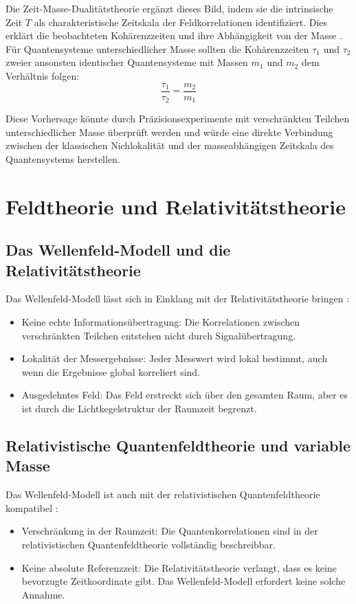 \documentclass[a4paper,12pt]{article}
\begin{document}
	Die Zeit-Masse-Dualitätstheorie ergänzt dieses Bild, indem sie die intrinsische Zeit $T$ als charakteristische Zeitskala der Feldkorrelationen identifiziert. Dies erklärt die beobachteten Kohärenzzeiten und ihre Abhängigkeit von der Masse \cite{Pascher2024}. Für Quantensysteme unterschiedlicher Masse sollten die Kohärenzzeiten $\tau_1$ und $\tau_2$ zweier ansonsten identischer Quantensysteme mit Massen $m_1$ und $m_2$ dem Verhältnis folgen:
	\begin{equation}
		\frac{\tau_1}{\tau_2} = \frac{m_2}{m_1}
	\end{equation}
	
	Diese Vorhersage könnte durch Präzisionsexperimente mit verschränkten Teilchen unterschiedlicher Masse überprüft werden und würde eine direkte Verbindung zwischen der klassischen Nichlokalität und der masseabhängigen Zeitskala des Quantensystems herstellen.
	
	\section{Feldtheorie und Relativitätstheorie}
	
	\subsection{Das Wellenfeld-Modell und die Relativitätstheorie}
	Das Wellenfeld-Modell lässt sich in Einklang mit der Relativitätstheorie bringen \cite{Maudlin2011}:
	\begin{itemize}
		\item Keine echte Informationsübertragung: Die Korrelationen zwischen verschränkten Teilchen entstehen nicht durch Signalübertragung.
		\item Lokalität der Messergebnisse: Jeder Messwert wird lokal bestimmt, auch wenn die Ergebnisse global korreliert sind.
		\item Ausgedehntes Feld: Das Feld erstreckt sich über den gesamten Raum, aber es ist durch die Lichtkegelstruktur der Raumzeit begrenzt.
	\end{itemize}
	
	\subsection{Relativistische Quantenfeldtheorie und variable Masse}
	Das Wellenfeld-Modell ist auch mit der relativistischen Quantenfeldtheorie kompatibel \cite{Weinberg1995}:
	\begin{itemize}
		\item Verschränkung in der Raumzeit: Die Quantenkorrelationen sind in der relativistischen Quantenfeldtheorie vollständig beschreibbar.
		\item Keine absolute Referenzzeit: Die Relativitätstheorie verlangt, dass es keine bevorzugte Zeitkoordinate gibt. Das Wellenfeld-Modell erfordert keine solche Annahme.
	\end{itemize}
	
\end{document}
